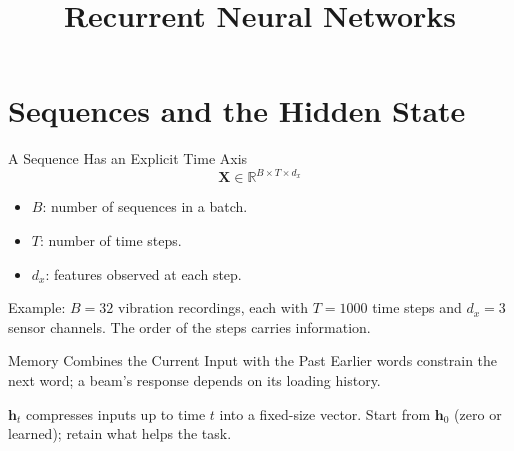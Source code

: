 \documentclass{ntuabeamer}
\title{Recurrent Neural Networks}
\author{}
\date{}
\begin{document}
\begin{frame}[plain]
  \makepresentationtitle
\end{frame}




\section{Sequences and the Hidden State}

\begin{frame}{A Sequence Has an Explicit Time Axis}
  \[
    \mathbf{X}\in\mathbb{R}^{B\times T\times d_x}
  \]
  \begin{itemize}
    \item $B$: number of sequences in a batch.
    \item $T$: number of time steps.
    \item $d_x$: features observed at each step.
  \end{itemize}
  \centering

  \vspace{0.1cm}
  Example: $B=32$ vibration recordings, each with $T=1000$ time steps and $d_x=3$ sensor channels.
  The order of the steps carries information.
\end{frame}

\begin{frame}{Memory Combines the Current Input with the Past}
  Earlier words constrain the next word; a beam's response depends on its loading history.
  \begin{center}
  \end{center}
  $\mathbf h_t$ compresses inputs up to time $t$ into a fixed-size vector.
  Start from $\mathbf h_0$ (zero or learned); retain what helps the task.
\end{frame}
\end{document}
